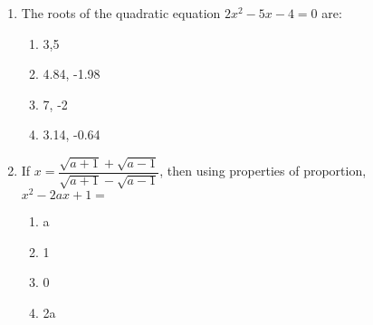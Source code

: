 \begin{enumerate}[label=(\roman*)]
    \item The roots of the quadratic equation $2x^2 - 5x -4 = 0$ are: 

        \begin{multicols}{2}
        \begin{enumerate}[label=(\alph*)]
            \item 3,5 
            \item 4.84, -1.98
            \item 7, -2
            \item 3.14, -0.64
        \end{enumerate}
        \end{multicols}

    \item If $x = \dfrac{\sqrt{a+1} + \sqrt{a-1}}{\sqrt{a+1} - \sqrt{a-1}}$,
        then using properties of proportion, $x^2 - 2ax + 1 =$

        \begin{multicols}{2}
        \begin{enumerate}[label=(\alph*)]
            \item a
            \item 1
            \item 0
            \item 2a
        \end{enumerate}
        \end{multicols}

\end{enumerate}

